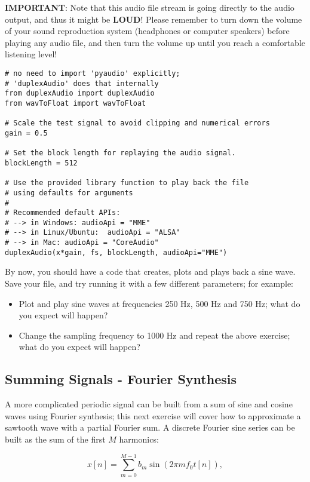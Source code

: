 \textbf{IMPORTANT}: Note that this audio file stream is going directly to the audio output, and thus it might be \textbf{LOUD}! Please remember to turn down the volume of your sound reproduction system (headphones or computer speakers) before playing any audio file, and then turn the volume up until you reach a comfortable listening level!

\begin{lstlisting}[frame=single]
# no need to import 'pyaudio' explicitly;
# 'duplexAudio' does that internally
from duplexAudio import duplexAudio
from wavToFloat import wavToFloat

# Scale the test signal to avoid clipping and numerical errors
gain = 0.5

# Set the block length for replaying the audio signal.
blockLength = 512

# Use the provided library function to play back the file
# using defaults for arguments
#
# Recommended default APIs:
# --> in Windows: audioApi = "MME"
# --> in Linux/Ubuntu:  audioApi = "ALSA"
# --> in Mac: audioApi = "CoreAudio"
duplexAudio(x*gain, fs, blockLength, audioApi="MME")
\end{lstlisting}

By now, you should have a code that creates, plots and plays back a sine wave. Save your file, and try running it with a few different parameters; for example:

\begin{itemize}
	\item Plot and play sine waves at frequencies 250 Hz, 500 Hz and 750 Hz; what do you expect will happen?
	\item Change the sampling frequency to 1000 Hz and repeat the above exercise; what do you expect will happen?
\end{itemize}


\subsection{Summing Signals - Fourier Synthesis}

A more complicated periodic signal can be built from a sum of sine and cosine waves using Fourier synthesis; this next exercise will cover how to approximate a sawtooth wave with a partial Fourier sum. A discrete Fourier sine series can be built as the sum of the first $M$ harmonics:

\begin{equation}
	x[n] = \sum_{m=0}^{M-1} b_m \sin(2 \pi m f_0 t[n]),
\end{equation}

